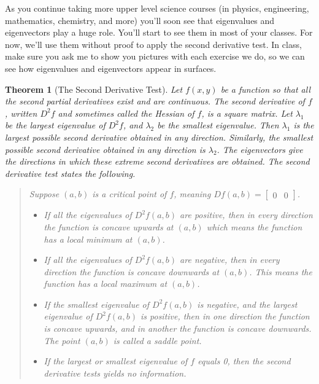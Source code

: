 \documentclass[10pt,]{book}
\theoremstyle{plain}
\newtheorem{theorem}{Theorem}[section]
\theoremstyle{definition}
\theoremstyle{definition}
\theoremstyle{definition}
\theoremstyle{definition}
\theoremstyle{definition}
\numberwithin{equation}{section}
\newcommand{\amp}{&}
\begin{document}
As you continue taking more upper level science courses (in physics, engineering, mathematics, chemistry, and more) you'll soon see that eigenvalues and eigenvectors play a huge role. You'll start to see them in most of your classes. For now, we'll use them without proof to apply the second derivative test. In class, make sure you ask me to show you pictures with each exercise we do, so we can see how eigenvalues and eigenvectors appear in surfaces.%
\begin{theorem}[{The Second Derivative Test}]\label{theorem-8}
Let \(f(x,y)\) be a function so that all the second partial derivatives exist and are continuous. The second derivative of \(f\), written \(D^2f\) and sometimes called the Hessian of \(f\), is a square matrix. Let \(\lambda_1\) be the largest eigenvalue of \(D^2f\), and \(\lambda_2\) be the smallest eigenvalue. Then \(\lambda_1\) is the largest possible second derivative obtained in any direction. Similarly, the smallest possible second derivative obtained in any direction is \(\lambda_2\). The eigenvectors give the directions in which these extreme second derivatives are obtained. The second derivative test states the following.%
\begin{quote}\hypertarget{blockquote-9}{}
Suppose \((a,b)\) is a critical point of \(f\), meaning \(Df(a,b) = \begin{bmatrix}0\amp 0
\end{bmatrix}\). \leavevmode%
\begin{itemize}[label=\textbullet]
\item{}If all the eigenvalues of \(D^2f(a,b)\) are positive, then in every direction the function is concave upwards at \((a,b)\) which means the function has a local minimum at \((a,b)\).%
\item{}If all the eigenvalues of \(D^2f(a,b)\) are negative, then in every direction the function is concave downwards at \((a,b)\). This means the function has a local maximum at \((a,b)\).%
\item{}If the smallest eigenvalue of \(D^2f(a,b)\) is negative, and the largest eigenvalue of \(D^2f(a,b)\) is positive, then  in one direction the function is concave upwards, and in another the function is concave downwards. The point \((a,b)\) is called a saddle point.%
\item{}If the largest or smallest eigenvalue of \(f\) equals 0, then the second derivative tests yields no information.%
\end{itemize}
\end{quote}
\end{theorem}
\end{document}
